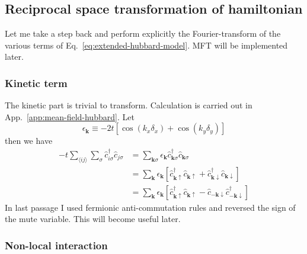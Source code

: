 \subsection{Reciprocal space transformation of hamiltonian}

Let me take a step back and perform explicitly the Fourier-transform of the various terms of Eq.~\ref{eq:extended-hubbard-model}. MFT will be implemented later.

\subsubsection*{Kinetic term}

The kinetic part is trivial to transform. Calculation is carried out in App.~\ref{app:mean-field-hubbard}. Let
\[
	\epsilon_\mathbf{k} \equiv -2t \left[
		\cos(k_x \delta_x) + \cos(k_y \delta_y)
	\right]
\]
then we have
\[
\begin{aligned}
	-t \sum_{\langle ij \rangle} \sum_\sigma \hat c_{i\sigma}^\dagger \hat c_{j\sigma} &= \sum_{\mathbf{k}\sigma} \epsilon_\mathbf{k} \hat c_{\mathbf{k}\sigma}^\dagger \hat c_{\mathbf{k}\sigma} \\
	&= \sum_\mathbf{k} \epsilon_\mathbf{k} \left[
		\hat c_{\mathbf{k}\uparrow}^\dagger \hat c_{\mathbf{k}\uparrow} + \hat c_{\mathbf{k}\downarrow}^\dagger \hat c_{\mathbf{k}\downarrow}
	\right] \\
	&= \sum_\mathbf{k} \epsilon_\mathbf{k} \left[
		\hat c_{\mathbf{k}\uparrow}^\dagger \hat c_{\mathbf{k}\uparrow}- \hat c_{-\mathbf{k}\downarrow} \hat c_{-\mathbf{k}\downarrow}^\dagger 
	\right]
\end{aligned}
\]
In last passage I used fermionic anti-commutation rules and reversed the sign of the mute variable. This will become useful later.

\subsubsection*{Non-local interaction}

